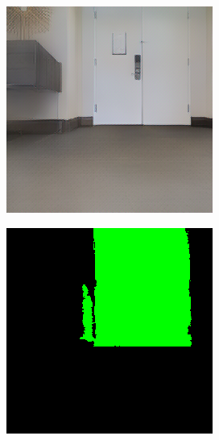\begin{figure}[h!]
	\centering
	\begin{subfigure}[b]{\linewidth}
		\centering
		\begin{subfigure}[b]{0.32\linewidth}
			\includegraphics[width=\textwidth]{images/wrong_box_rgb_1.png}
		\end{subfigure}
		\hfil
		\begin{subfigure}[b]{0.32\linewidth}
			\includegraphics[width=\textwidth]{images/wrong_box_semantic_1.png}

\end{subfigure}
\end{subfigure}
\end{figure}
